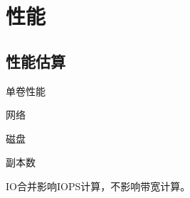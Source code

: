 \chapter{性能}

\section{性能估算}

\begin{enumbox}
\item 单卷性能
\item 网络
\item 磁盘
\item 副本数
\end{enumbox}

IO合并影响IOPS计算，不影响带宽计算。
